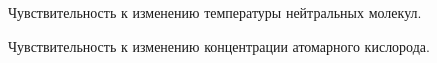 \documentclass[14pt, a4paper, fleqn, twoside]{extreport}
\begin{document}
\begin{figure}
\caption{Чувствительность к изменению температуры нейтральных молекул.}
\end{figure}

\begin{figure}
\caption{Чувствительность к изменению концентрации атомарного кислорода.}
\end{figure}
\end{document}
